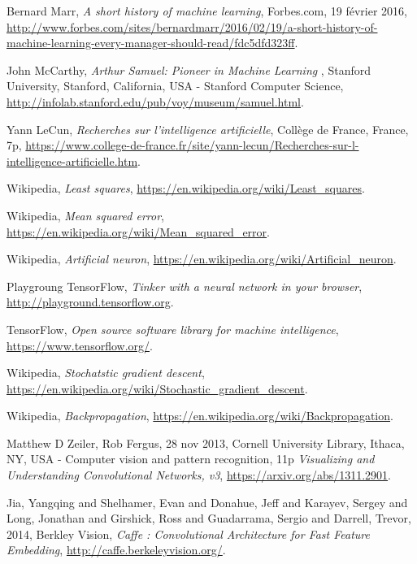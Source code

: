\begin{thebibliography}{9}

  Bernard Marr,
  \emph{A short history of machine learning},
  Forbes.com, 19 février 2016,
  \url{http://www.forbes.com/sites/bernardmarr/2016/02/19/a-short-history-of-machine-learning-every-manager-should-read/fdc5dfd323ff}.

  John McCarthy,
  \emph{Arthur Samuel: Pioneer in Machine Learning },
  Stanford University, Stanford, California, USA -
  Stanford Computer Science,
  \url{http://infolab.stanford.edu/pub/voy/museum/samuel.html}.

  Yann LeCun,
  \emph{Recherches sur l'intelligence artificielle},
  Collège de France, France,
  7p,
  \url{https://www.college-de-france.fr/site/yann-lecun/Recherches-sur-l-intelligence-artificielle.htm}.

  Wikipedia, \emph{Least squares},
  \url{https://en.wikipedia.org/wiki/Least_squares}.

  Wikipedia,
  \emph{Mean squared error},
  \url{https://en.wikipedia.org/wiki/Mean_squared_error}.

  Wikipedia,
  \emph{Artificial neuron},
  \url{https://en.wikipedia.org/wiki/Artificial_neuron}.

  Playgroung TensorFlow,
  \emph{Tinker with a neural network in your browser},
  \url{http://playground.tensorflow.org}.

  TensorFlow,
  \emph{Open source software library for machine intelligence},
  \url{https://www.tensorflow.org/}.

  Wikipedia,
  \emph{Stochatstic gradient descent},
  \url{https://en.wikipedia.org/wiki/Stochastic_gradient_descent}.

  Wikipedia,
  \emph{Backpropagation},
  \url{https://en.wikipedia.org/wiki/Backpropagation}.

  Matthew D Zeiler, Rob Fergus,
  28 nov 2013,
  Cornell University Library, Ithaca, NY, USA -
  Computer vision and pattern recognition,
  11p
  \emph{Visualizing and Understanding Convolutional Networks, v3},
  \url{https://arxiv.org/abs/1311.2901}.

  Jia, Yangqing and Shelhamer, Evan and Donahue, Jeff and Karayev, Sergey and Long, Jonathan and Girshick, Ross and Guadarrama, Sergio and Darrell, Trevor,
  2014,
  Berkley Vision,
  \emph{Caffe : Convolutional Architecture for Fast Feature Embedding},
  \url{http://caffe.berkeleyvision.org/}.


\end{thebibliography}

